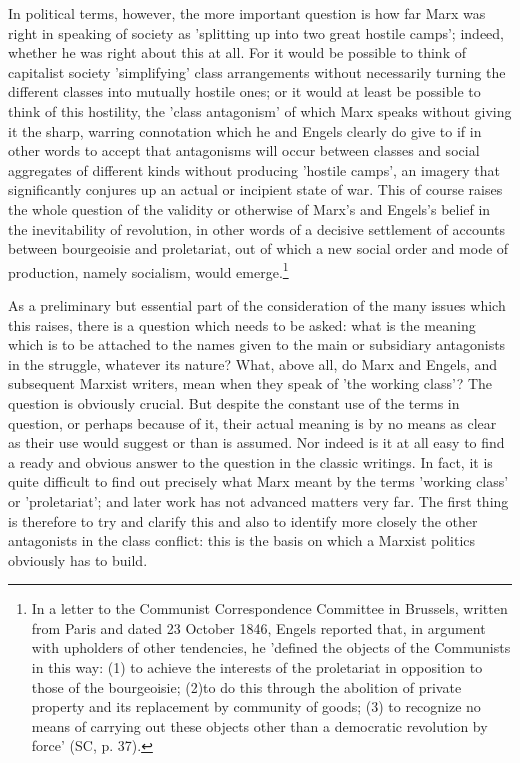 In political terms, however, the more important question is how far Marx was right in speaking of society as 'splitting up into two great hostile camps'; indeed, whether he was right about this at all. For it would be possible to think of capitalist society 'simplifying' class arrangements without necessarily turning the different classes into mutually hostile ones; or it would at least be possible to think of this hostility, the 'class antagonism' of which Marx speaks without giving it the sharp, warring connotation which he and Engels clearly do give to if in other words to accept that antagonisms will occur between classes and social aggregates of different kinds without producing 'hostile camps', an imagery that significantly conjures up an actual or incipient state of war. This of course raises the whole question of the validity or otherwise of Marx's and Engels's belief in the inevitability of revolution, in other words of a decisive settlement of accounts between bourgeoisie and proletariat, out of which a new social order and mode of production, namely socialism, would emerge.\footnote{In a letter to the Communist Correspondence Committee in Brussels, written from Paris and dated 23 October 1846, Engels reported that, in argument with upholders of other tendencies, he 'defined the objects of the Communists in this way: (1) to achieve the interests of the proletariat in opposition to those of the bourgeoisie; (2)to do this through the abolition of private property and its replacement by community of goods; (3) to recognize no means of carrying out these objects other than a democratic revolution by force' (SC, p. 37).}

As a preliminary but essential part of the consideration of the many issues which this raises, there is a question which needs to be asked: what is the meaning which is to be attached to the names given to the main or subsidiary antagonists in the struggle, whatever its nature? What, above all, do Marx and Engels, and subsequent Marxist writers, mean when they speak of 'the working class'? The question is obviously crucial. But despite the constant use of the terms in question, or perhaps because of it, their actual meaning is by no means as clear as their use would suggest or than is assumed. Nor indeed is it at all easy to find a ready and obvious answer to the question in the classic writings. In fact, it is quite difficult to find out precisely what Marx meant by the terms 'working class' or 'proletariat'; and later work has not advanced matters very far. The first thing is therefore to try and clarify this and also to identify more closely the other antagonists in the class conflict: this is the basis on which a Marxist politics obviously has to build.

